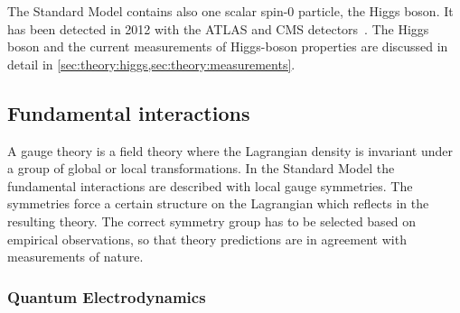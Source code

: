 The Standard Model contains also one scalar spin-0 particle, the Higgs boson.
It has been detected in 2012 with the ATLAS and CMS detectors~\cite{HiggsDiscoveryATLAS,HiggsDiscoveryCMS}.
The Higgs boson and the current measurements of Higgs-boson properties are discussed in detail in \cref{sec:theory:higgs,sec:theory:measurements}.

\subsection{Fundamental interactions}\label{sub:theory:sm:interactions}

A gauge theory is a field theory where the Lagrangian density is invariant under a group of global or local transformations.
In the Standard Model the fundamental interactions are described with local gauge symmetries.
The symmetries force a certain structure on the Lagrangian which reflects in the resulting theory.
The correct symmetry group has to be selected based on empirical observations, so that theory predictions are in agreement with measurements of nature.

\subsubsection{Quantum Electrodynamics}

